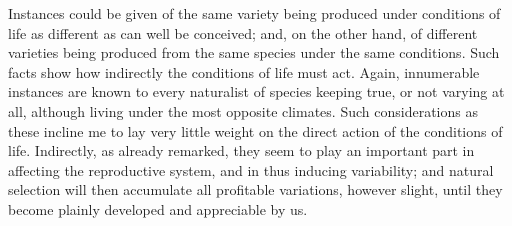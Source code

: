 Instances could be given of the same variety being produced under conditions of life as different as can well be conceived; and, on the other hand, of different varieties being produced from the same species under the same conditions. Such facts show how indirectly the conditions of life must act. Again, innumerable instances are known to every naturalist of species keeping true, or not varying at all, although living under the most opposite climates. Such considerations as these incline me to lay very little weight on the direct action of the conditions of life. Indirectly, as already remarked, they seem to play an important part in affecting the reproductive system, and in thus inducing variability; and natural selection will then accumulate all profitable variations, however slight, until they become plainly developed and appreciable by us.

